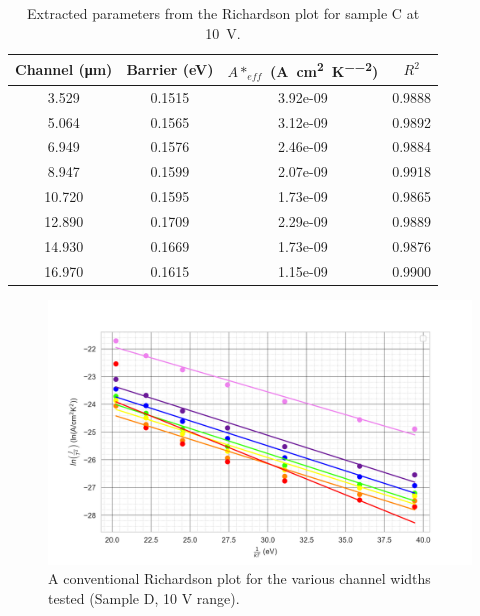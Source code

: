 \begin{refsection}
\begin{table}[h]
    \centering
    \begin{tabular}{|c|c|c|c|}
        \hline
        Channel (\si{\micro\metre}) & Barrier (\si{\electronvolt}) & $A*_{eff}$ (\si{\ampere\per\centi\metre\squared\per\kelvin\squared}) & $R^{2}$\\ \hline
        3.529 & 0.1515  & 3.92e-09 &0.9888 \\ 
        5.064 & 0.1565  & 3.12e-09 &0.9892 \\ 
        6.949 & 0.1576  & 2.46e-09 &0.9884 \\ 
        8.947 & 0.1599  & 2.07e-09 &0.9918 \\ 
        10.720 & 0.1595  & 1.73e-09 &0.9865 \\ 
        12.890 & 0.1709 & 2.29e-09 &0.9889 \\ 
        14.930 & 0.1669  & 1.73e-09 &0.9876 \\ 
        16.970 & 0.1615  & 1.15e-09 &0.9900 \\ 
        \hline
    \end{tabular}
    \caption{Extracted parameters from the Richardson plot for sample C at 10~\si{\volt}.}
    \label{tab:richardsonC}
\end{table}

\begin{figure}
    \centering
    \includegraphics{Chapter3/Figs/Raster/Sample D 2019/newRichardson_Plot_10V.png}
    \caption{A conventional Richardson plot for the various channel widths tested (Sample D, 10 V range).}
    \label{fig:richardsonD}
\end{figure}


\end{refsection}
